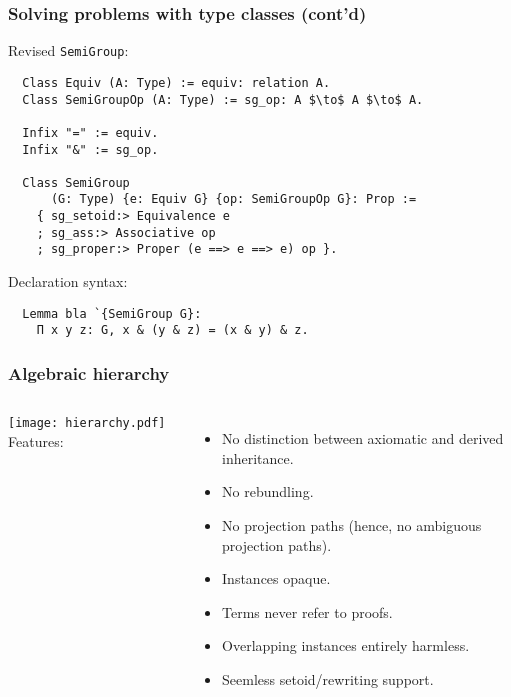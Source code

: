 \documentclass{beamer}
\begin{document}
\begin{frame}[fragile]
\frametitle{Solving problems with type classes (cont'd)}
Revised \lstinline|SemiGroup|:
\begin{lstlisting}
  Class Equiv (A: Type) := equiv: relation A.
  Class SemiGroupOp (A: Type) := sg_op: A $\to$ A $\to$ A.

  Infix "=" := equiv.
  Infix "&" := sg_op.

  Class SemiGroup
      (G: Type) {e: Equiv G} {op: SemiGroupOp G}: Prop :=
    { sg_setoid:> Equivalence e
    ; sg_ass:> Associative op
    ; sg_proper:> Proper (e ==> e ==> e) op }.
\end{lstlisting}

\end{frame}

\begin{frame}[fragile]
Declaration syntax:

\begin{lstlisting}
  Lemma bla `{SemiGroup G}:
    Π x y z: G, x & (y & z) = (x & y) & z.
\end{lstlisting}
\end{frame}



\begin{frame}[fragile]
\frametitle{Algebraic hierarchy}

\begin{columns}
    \texttt{[image: hierarchy.pdf]}
Features:
\begin{itemize}
\item No distinction between axiomatic and derived inheritance.

\item No rebundling.
\item No projection paths (hence, no ambiguous projection paths).
\item Instances opaque. %
\item Terms never refer to proofs. %
\item Overlapping instances entirely harmless. %
\item Seemless setoid/rewriting support.
\end{itemize}
\end{columns}
\end{frame}
\end{document}
